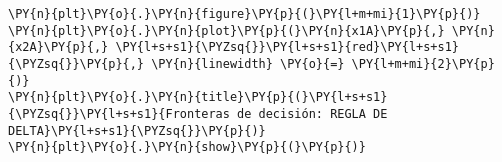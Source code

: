 \begin{tcolorbox}[breakable, size=fbox, boxrule=1pt, pad at break*=1mm,colback=cellbackground, colframe=cellborder]
\begin{Verbatim}[commandchars=\\\{\}]
\PY{n}{plt}\PY{o}{.}\PY{n}{figure}\PY{p}{(}\PY{l+m+mi}{1}\PY{p}{)}
\PY{n}{plt}\PY{o}{.}\PY{n}{plot}\PY{p}{(}\PY{n}{x1A}\PY{p}{,} \PY{n}{x2A}\PY{p}{,} \PY{l+s+s1}{\PYZsq{}}\PY{l+s+s1}{red}\PY{l+s+s1}{\PYZsq{}}\PY{p}{,} \PY{n}{linewidth} \PY{o}{=} \PY{l+m+mi}{2}\PY{p}{)}
\PY{n}{plt}\PY{o}{.}\PY{n}{title}\PY{p}{(}\PY{l+s+s1}{\PYZsq{}}\PY{l+s+s1}{Fronteras de decisión: REGLA DE DELTA}\PY{l+s+s1}{\PYZsq{}}\PY{p}{)}
\PY{n}{plt}\PY{o}{.}\PY{n}{show}\PY{p}{(}\PY{p}{)}
\end{Verbatim}
\end{tcolorbox}

    \begin{center}
    \end{center}
    { \hspace*{\fill} \\}
    
